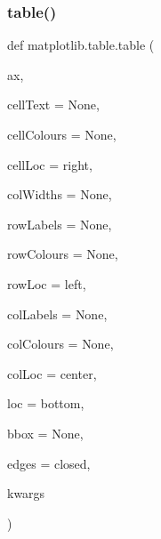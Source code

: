 \subsubsection{\texorpdfstring{table()}{table()}}
{\footnotesize\ttfamily def matplotlib.\+table.\+table (\begin{DoxyParamCaption}\item[{}]{ax,  }\item[{}]{cell\+Text = {\ttfamily None},  }\item[{}]{cell\+Colours = {\ttfamily None},  }\item[{}]{cell\+Loc = {\ttfamily \textquotesingle{}right\textquotesingle{}},  }\item[{}]{col\+Widths = {\ttfamily None},  }\item[{}]{row\+Labels = {\ttfamily None},  }\item[{}]{row\+Colours = {\ttfamily None},  }\item[{}]{row\+Loc = {\ttfamily \textquotesingle{}left\textquotesingle{}},  }\item[{}]{col\+Labels = {\ttfamily None},  }\item[{}]{col\+Colours = {\ttfamily None},  }\item[{}]{col\+Loc = {\ttfamily \textquotesingle{}center\textquotesingle{}},  }\item[{}]{loc = {\ttfamily \textquotesingle{}bottom\textquotesingle{}},  }\item[{}]{bbox = {\ttfamily None},  }\item[{}]{edges = {\ttfamily \textquotesingle{}closed\textquotesingle{}},  }\item[{}]{kwargs }\end{DoxyParamCaption})}

